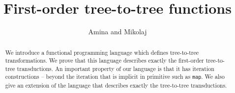 \documentclass[sigplan,10pt,manonymous]{acmart}\settopmatter{printfolios=true,printccs=false,printacmref=false}
\begin{document}
 \title{First-order tree-to-tree functions}
 \author{Amina and Mikolaj}
 \begin{abstract}
    We introduce a functional programming language which defines tree-to-tree transformations. We prove that this language describes exactly the first-order tree-to-tree transductions. An important property of our language is that it has iteration constructions -- beyond the iteration that is implicit in primitive such as {\tt map}. We also give an extension of the language that describes exactly the \mso tree-to-tree transductions.
\end{abstract}

 \maketitle






%


%


%
%






\appendix






% 
\end{document}
